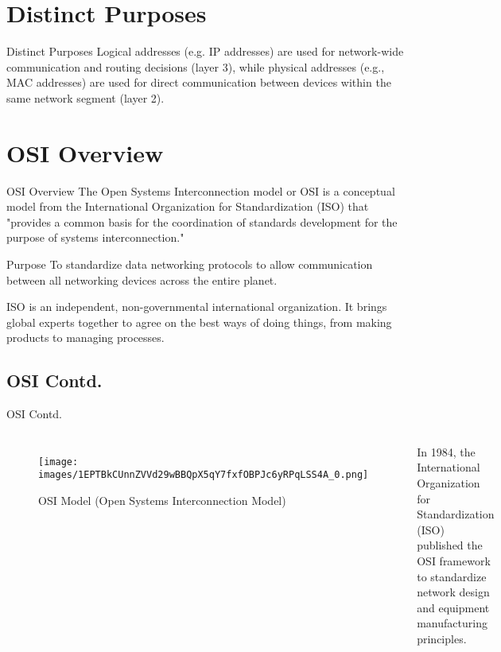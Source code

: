 \documentclass[10pt, aspectratio=43]{beamer}
\begin{document}
\section{Distinct Purposes}
\begin{frame}{Distinct Purposes}
    Logical addresses (e.g. IP addresses) are used for network-wide communication and routing decisions (layer 3), while physical addresses (e.g., MAC addresses) are used for direct communication between devices within the same network segment (layer 2). 
\end{frame}


\section{OSI Overview}

\begin{frame}{OSI Overview}
The Open Systems Interconnection model or OSI is a conceptual model from the International Organization for Standardization (ISO) that "provides a common basis for the coordination of standards development for the purpose of systems interconnection."

\begin{block}{Purpose}
    To standardize data networking protocols to allow communication between all networking devices across the entire planet.
\end{block}

        \begin{block}{}
    ISO is an independent, non-governmental international organization. It brings global experts together to agree on the best ways of doing things, from making products to managing processes.
\end{block}
\end{frame}

\subsection{OSI Contd.}
\begin{frame}{OSI Contd.}
\begin{columns}
\begin{figure}[h] %
    \centering
    \texttt{[image: images/1EPTBkCUnnZVVd29wBBQpX5qY7fxfOBPJc6yRPqLSS4A\_0.png]}
    \caption{OSI Model (Open Systems Interconnection Model)}
\end{figure}
\FloatBarrier
{}
 In 1984, the International Organization for Standardization (ISO) published the OSI framework to standardize network design and equipment manufacturing principles.
\end{columns}
\end{frame}
\end{document}
